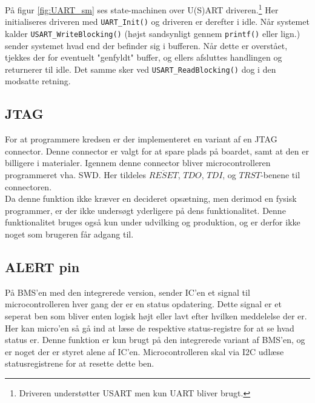 På figur \ref{fig:UART_sm} ses state-machinen over U(S)ART driveren.\footnote{Driveren understøtter USART men kun UART bliver brugt.} Her initialiseres driveren med \verb|UART_Init()| og driveren er derefter i idle. Når systemet kalder \verb|USART_WriteBlocking()| (højst sandsynligt gennem \verb|printf()| eller lign.) sender systemet hvad end der befinder sig i bufferen. Når dette er overstået, tjekkes der for eventuelt "genfyldt" buffer, og ellers afsluttes handlingen og returnerer til idle. Det samme sker ved \verb|USART_ReadBlocking()| dog i den modsatte retning. 

\subsection{JTAG}
For at programmere kredsen er der implementeret en variant af en JTAG connector. Denne connector er valgt for at spare plads på boardet, samt at den er billigere i materialer. Igennem denne connector bliver microcontrolleren programmeret vha. SWD. Her tildeles $\overline{RESET}$, $TDO$, $TDI$, og $TRST$-benene til connectoren. \\

Da denne funktion ikke kræver en decideret opsætning, men derimod en fysisk programmer, er der ikke undersøgt yderligere på dens funktionalitet. Denne funktionalitet bruges også kun under udvilking og produktion, og er derfor ikke noget som brugeren får adgang til. 

\subsection{ALERT pin}
På BMS'en med den integrerede version, sender IC'en et signal til microcontrolleren hver gang der er en status opdatering. Dette signal er et seperat ben som bliver enten logisk højt eller lavt efter hvilken meddelelse der er. Her kan micro'en så gå ind at læse de respektive status-registre for at se hvad status er. Denne funktion er kun brugt på den integrerede variant af BMS'en, og er noget der er styret alene af IC'en. Microcontrolleren skal via I2C udlæse statusregistrene for at resette dette ben. 
